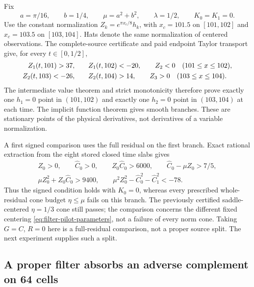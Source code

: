 \documentclass[11pt]{article}
\numberwithin{equation}{section}
\theoremstyle{definition}
\theoremstyle{remark}
\begin{document}
Fix
\begin{equation}
 a=\pi/16,\qquad b=1/4,\qquad \mu=a^2+b^2,\qquad
 \lambda=1/2,\qquad K_0=K_1=0.
 \label{eq:filter-pilot-parameters}
\end{equation}
Use the constant normalization $Z_k=e^{\pi x_c/8}h_k$, with
$x_c=101.5$ on $[101,102]$ and $x_c=103.5$ on $[103,104]$.
Hats denote the same normalization of centered observations.
The complete-source certificate and paid endpoint Taylor transport give,
for every $t\in[0,1/2]$,
\begin{align}
 Z_1(t,101)>37,\qquad& Z_1(t,102)<-20,\qquad Z_2<0
                       \quad(101\le x\le102),\notag\\
 Z_2(t,103)<-26,\qquad& Z_2(t,104)>14,\qquad Z_3>0
                       \quad(103\le x\le104).
 \label{eq:pilot-stationary-endpoints}
\end{align}
The intermediate value theorem and strict monotonicity therefore prove
exactly one $h_1=0$ point in $(101,102)$ and exactly one $h_2=0$ point
in $(103,104)$ at each time. The implicit function theorem gives smooth
branches. These are stationary points of the physical derivatives,
not derivatives of a variable normalization.

A first signed comparison uses the full residual on the first branch.
Exact rational extraction from the eight stored closed time slabs gives
\begin{equation}
 \begin{gathered}
 Z_0>0,\qquad\widehat C_0>0,\qquad
 Z_0\widehat C_0>6000,\qquad\widehat C_0-\mu Z_0>7/5,\\
 \mu Z_0^2+Z_0\widehat C_0>9400,\qquad
 \mu^2Z_0^2-\widehat C_0^2-\widehat C_1^2<-78.
 \end{gathered}
 \label{eq:full-residual-signed-pilot}
\end{equation}
Thus the signed condition holds with $K_0=0$, whereas every prescribed
whole-residual cone budget $\eta\le\mu$ fails on this branch.
The previously certified saddle-centered $\eta=1/3$ cone still passes;
the comparison concerns the different fixed centering
\eqref{eq:filter-pilot-parameters}, not a failure of every norm cone.
Taking $G=C$, $R=0$ here is a full-residual comparison, not a proper
source split. The next experiment supplies such a split.

\subsection{A proper filter absorbs an adverse complement on 64 cells}
\end{document}
